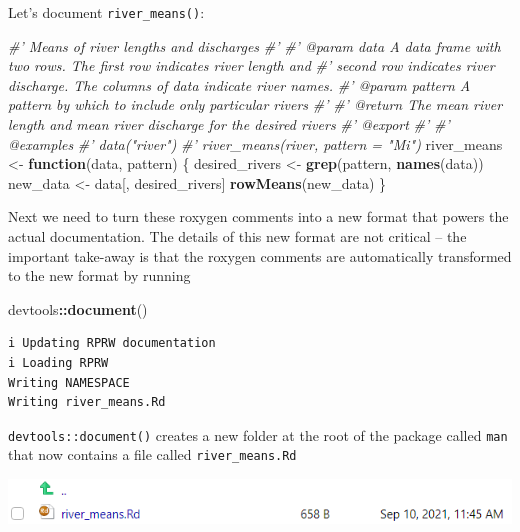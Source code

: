 \documentclass[
]{book}
\newenvironment{Shaded}{\begin{snugshade}}{\end{snugshade}}
\newcommand{\CommentTok}[1]{\textcolor[rgb]{0.56,0.35,0.01}{\textit{#1}}}
\newcommand{\ControlFlowTok}[1]{\textcolor[rgb]{0.13,0.29,0.53}{\textbf{#1}}}
\newcommand{\KeywordTok}[1]{\textcolor[rgb]{0.13,0.29,0.53}{\textbf{#1}}}
\newcommand{\NormalTok}[1]{#1}
\newcommand{\OperatorTok}[1]{\textcolor[rgb]{0.81,0.36,0.00}{\textbf{#1}}}
\newcommand{\StringTok}[1]{\textcolor[rgb]{0.31,0.60,0.02}{#1}}
\begin{document}
Let's document \texttt{river\_means()}:

\begin{Shaded}
\begin{Highlighting}[]
\CommentTok{#' Means of river lengths and discharges}
\CommentTok{#'}
\CommentTok{#' @param data A data frame with two rows. The first row indicates river length and}
\CommentTok{#'   second row indicates river discharge. The columns of data indicate river names.}
\CommentTok{#' @param pattern A pattern by which to include only particular rivers}
\CommentTok{#'}
\CommentTok{#' @return The mean river length and mean river discharge for the desired rivers}
\CommentTok{#' @export}
\CommentTok{#'}
\CommentTok{#' @examples}
\CommentTok{#' data("river")}
\CommentTok{#' river_means(river, pattern = "Mi")}
\NormalTok{river_means <-}\StringTok{ }\ControlFlowTok{function}\NormalTok{(data, pattern) \{}
\NormalTok{  desired_rivers <-}\StringTok{ }\KeywordTok{grep}\NormalTok{(pattern, }\KeywordTok{names}\NormalTok{(data))}
\NormalTok{  new_data <-}\StringTok{ }\NormalTok{data[, desired_rivers]}
  \KeywordTok{rowMeans}\NormalTok{(new_data)}
\NormalTok{\}}
\end{Highlighting}
\end{Shaded}

Next we need to turn these roxygen comments into a new format that powers the actual documentation. The details of this new format are not critical -- the important take-away is that the roxygen comments are automatically transformed to the new format by running

\begin{Shaded}
\begin{Highlighting}[]
\NormalTok{devtools}\OperatorTok{::}\KeywordTok{document}\NormalTok{()}
\end{Highlighting}
\end{Shaded}

\begin{verbatim}
i Updating RPRW documentation
i Loading RPRW
Writing NAMESPACE
Writing river_means.Rd
\end{verbatim}

\texttt{devtools::document()} creates a new folder at the root of the package called \texttt{man} that now contains a file called \texttt{river\_means.Rd}

\includegraphics[width=1\linewidth]{images/newrpack_files2}
\end{document}

